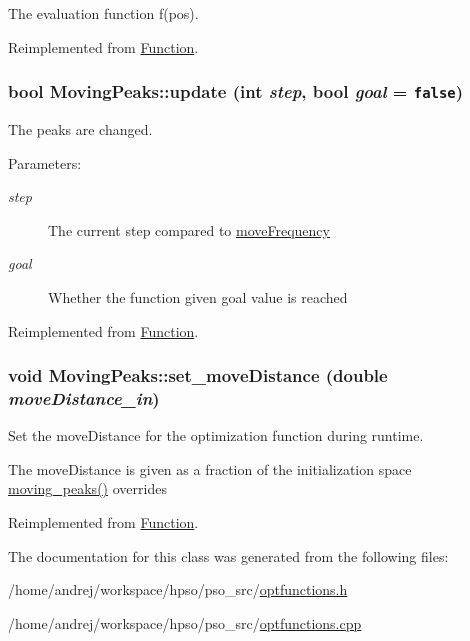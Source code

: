The evaluation function f(pos). 



Reimplemented from \hyperlink{classFunction_159260a1fc3afa8932491e4057b6b844}{Function}.\hypertarget{classMovingPeaks_84fcf2d3c8600f0dcd7f512ae70c19b4}{
\subsubsection{\setlength{\rightskip}{0pt plus 5cm}bool MovingPeaks::update (int {\em step}, \/  bool {\em goal} = {\tt false})}}
\label{classMovingPeaks_84fcf2d3c8600f0dcd7f512ae70c19b4}


The peaks are changed. 

\begin{Desc}
\item[Parameters: ]\par
\begin{description}
\item[{\em 
step}]The current step compared to \hyperlink{classFunction_323cbb2de44582df3b9981e6c3416980}{moveFrequency} \item[{\em 
goal}]Whether the function given goal value is reached \end{description}
\end{Desc}


Reimplemented from \hyperlink{classFunction_31bae656cf84683529a1a8c19c9f0a67}{Function}.\hypertarget{classMovingPeaks_eb39c06b043a569f8971fb5e98d2f63e}{
\subsubsection{\setlength{\rightskip}{0pt plus 5cm}void MovingPeaks::set\_\-moveDistance (double {\em moveDistance\_\-in})}}
\label{classMovingPeaks_eb39c06b043a569f8971fb5e98d2f63e}


Set the moveDistance for the optimization function during runtime. 

The moveDistance is given as a fraction of the initialization space \hyperlink{optfunctions_8h_6e6333c061b2073ba9abaaf67e20164b9091fc9ba8ac52e7acab2c60d84758b3}{moving\_\-peaks()} overrides 

Reimplemented from \hyperlink{classFunction_36161c4387e7d67a916d86863c807e18}{Function}.

The documentation for this class was generated from the following files:\begin{CompactItemize}
\item 
/home/andrej/workspace/hpso/pso\_\-src/\hyperlink{optfunctions_8h}{optfunctions.h}\item 
/home/andrej/workspace/hpso/pso\_\-src/\hyperlink{optfunctions_8cpp}{optfunctions.cpp}\end{CompactItemize}
